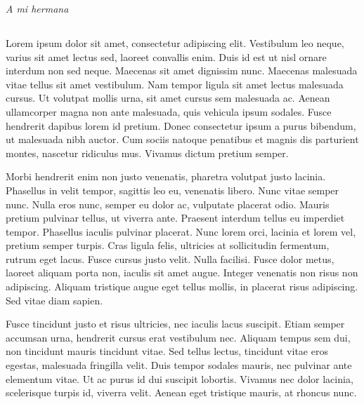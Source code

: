 \documentclass[12pt,twoside,openright,english,spanish]{toptesi}
\begin{document}


\begin{flushright}
\null{}
{\textit{A mi hermana}}
\null
\end{flushright}
\thispagestyle{empty}
\pagebreak

\newpage
\thispagestyle{empty}
\mbox{}
\pagebreak

\subsection*{}
\thispagestyle{empty}
Lorem ipsum dolor sit amet, consectetur adipiscing elit. Vestibulum leo neque, varius sit amet lectus sed, laoreet convallis enim. Duis id est ut nisl ornare interdum non sed neque. Maecenas sit amet dignissim nunc. Maecenas malesuada vitae tellus sit amet vestibulum. Nam tempor ligula sit amet lectus malesuada cursus. Ut volutpat mollis urna, sit amet cursus sem malesuada ac. Aenean ullamcorper magna non ante malesuada, quis vehicula ipsum sodales. Fusce hendrerit dapibus lorem id pretium. Donec consectetur ipsum a purus bibendum, ut malesuada nibh auctor. Cum sociis natoque penatibus et magnis dis parturient montes, nascetur ridiculus mus. Vivamus dictum pretium semper.

Morbi hendrerit enim non justo venenatis, pharetra volutpat justo lacinia. Phasellus in velit tempor, sagittis leo eu, venenatis libero. Nunc vitae semper nunc. Nulla eros nunc, semper eu dolor ac, vulputate placerat odio. Mauris pretium pulvinar tellus, ut viverra ante. Praesent interdum tellus eu imperdiet tempor. Phasellus iaculis pulvinar placerat. Nunc lorem orci, lacinia et lorem vel, pretium semper turpis. Cras ligula felis, ultricies at sollicitudin fermentum, rutrum eget lacus. Fusce cursus justo velit. Nulla facilisi. Fusce dolor metus, laoreet aliquam porta non, iaculis sit amet augue. Integer venenatis non risus non adipiscing. Aliquam tristique augue eget tellus mollis, in placerat risus adipiscing. Sed vitae diam sapien.

Fusce tincidunt justo et risus ultricies, nec iaculis lacus suscipit. Etiam semper accumsan urna, hendrerit cursus erat vestibulum nec. Aliquam tempus sem dui, non tincidunt mauris tincidunt vitae. Sed tellus lectus, tincidunt vitae eros egestas, malesuada fringilla velit. Duis tempor sodales mauris, nec pulvinar ante elementum vitae. Ut ac purus id dui suscipit lobortis. Vivamus nec dolor lacinia, scelerisque turpis id, viverra velit. Aenean eget tristique mauris, at rhoncus nunc.
\end{document}
